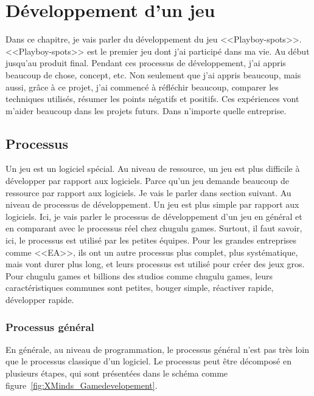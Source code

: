 \chapter{Développement d'un jeu} %
\label{cha:développement_d_un_jeu}

Dans ce chapitre, je vais parler du développement du jeu <<Playboy-spots>>. <<Playboy-spots>> est le premier jeu dont j'ai participé dans ma vie. Au début jusqu'au produit final. Pendant ces processus de développement, j'ai appris beaucoup de chose, concept, etc. Non seulement que j'ai appris beaucoup, mais aussi, grâce à ce projet, j'ai commencé à réfléchir beaucoup, comparer les techniques utilisés, résumer les points négatifs et positifs. Ces expériences vont m'aider beaucoup dans les projets futurs. Dans n'importe quelle entreprise.

\section{Processus} %
\label{sec:processus}

Un jeu est un logiciel spécial. Au niveau de ressource, un jeu est plus difficile à développer par rapport aux logiciels. Parce qu’un jeu demande beaucoup de ressource par rapport aux logiciels. Je vais le parler dans section suivant. Au niveau de processus de développement. Un jeu est plus simple par rapport aux logiciels. Ici, je vais parler le processus de développement d'un jeu en général et en comparant avec le processus réel chez chugulu games. Surtout, il faut savoir, ici, le processus est utilisé par les petites équipes. Pour les grandes entreprises comme <<EA>>, ils ont un autre processus plus complet, plus systématique, mais vont durer plus long, et leurs processus est utilisé pour créer des jeux gros. Pour chugulu games et billions des studios comme chugulu games, leurs caractéristiques communes sont petites, bouger simple, réactiver rapide, développer rapide. 

\subsection{Processus général} %
\label {sub:processus_général}

En générale, au niveau de programmation, le processus général n'est pas très loin que le processus classique d'un logiciel. Le processus peut être décomposé en plusieurs étapes, qui sont présentées dans le schéma comme figure~\ref{fig:XMinds_Gamedevelopement}.


